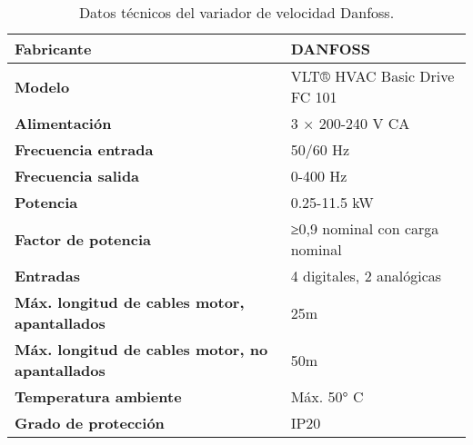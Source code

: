 \renewcommand{\arraystretch}{2}
\begin{table}[H]
    \centering
    \caption{Datos técnicos del variador de velocidad Danfoss.}
    \label{table:variador_velocidad}
    \begin{tabular}{| L{5cm} | L{5cm} |}
        \hline
        \textbf{Fabricante} & DANFOSS  \\
        \hline
        \textbf{Modelo} & VLT® HVAC Basic Drive FC 101  \\
        \hline
        \textbf{Alimentación} & 3 × 200-240 V CA  \\
        \hline
        \textbf{Frecuencia entrada} & 50/60 Hz  \\
        \hline
        \textbf{Frecuencia salida} & 0-400 Hz  \\
        \hline
        \textbf{Potencia} & 0.25-11.5 kW  \\
        \hline
        \textbf{Factor de potencia} & ≥0,9 nominal con carga nominal  \\
        \hline
        \textbf{Entradas} & 4 digitales, 2 analógicas  \\
        \hline
        \textbf{Máx. longitud de cables motor, apantallados} & 25m  \\
        \hline
        \textbf{Máx. longitud de cables motor, no apantallados} & 50m  \\
        \hline
        \textbf{Temperatura ambiente} & Máx. 50° C  \\
        \hline
        \textbf{Grado de protección} & IP20  \\
        \hline
    \end{tabular}
\end{table}